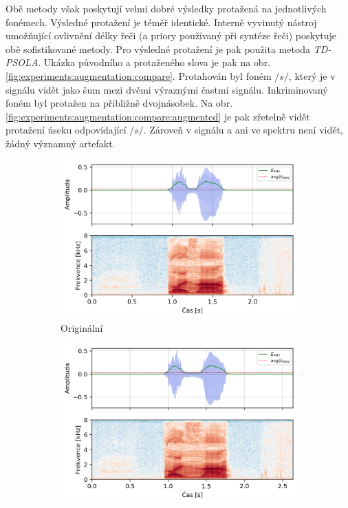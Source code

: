 Obě metody však poskytují velmi dobré výsledky protažená na jednotlivých fonémech. Výsledné protažení je téměř identické. Interně vyvinutý nástroj umožňující ovlivnění délky řeči (a priory používaný při syntéze řeči) poskytuje obě sofistikované metody. Pro výsledné protažení je pak použita metoda \textit{TD-PSOLA}. Ukázka původního a protaženého slova  je pak na obr. \ref{fig:experiments:augmentation:compare}. Protahován byl foném $/s/$, který je v signálu vidět jako šum mezi dvěmi výraznými častmi signálu. Inkriminovaný foném byl protažen na přibližně dvojnásobek. Na obr. \ref{fig:experiments:augmentation:compare:augmented} je pak zřetelně vidět protažení úseku odpovídající $/s/$. Zároveň v signálu a ani ve spektru není vidět, žádný významný artefakt.

\begin{figure}[htpb]
  \centering
  \begin{subfigure}[b]{0.42\textwidth}
    \includegraphics[width=\textwidth]{./ch4-experiments/img/energy_spec_word-normal.png}
    \caption{Originální}
    \label{fig:experiments:augmentation:compare:original}
  \end{subfigure}
  \begin{subfigure}[b]{0.42\textwidth}
    \includegraphics[width=\textwidth]{./ch4-experiments/img/energy_spec_word-augmented.png}

\end{subfigure}
\end{figure}

